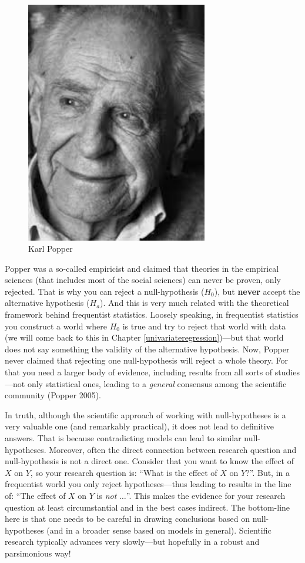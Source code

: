 \documentclass[
]{book}
\begin{document}
\begin{figure}

{\centering \includegraphics[width=300px]{./figures/popper} 

}

\caption{Karl Popper}\label{fig:popper}
\end{figure}

Popper was a so-called empiricist and claimed that theories in the empirical sciences (that includes most of the social sciences) can never be proven, only rejected. That is why you can reject a null-hypothesis (\(H_0\)), but \textbf{never} accept the alternative hypothesis (\(H_a\)). And this is very much related with the theoretical framework behind frequentist statistics. Loosely speaking, in frequentist statistics you construct a world where \(H_0\) is true and try to reject that world with data (we will come back to this in Chapter \ref{univariateregression})---but that world does not say something the validity of the alternative hypothesis. Now, Popper never claimed that rejecting one null-hypothesis will reject a whole theory. For that you need a larger body of evidence, including results from all sorts of studies---not only statistical ones, leading to a \emph{general} consensus among the scientific community (Popper 2005).

In truth, although the scientific approach of working with null-hypotheses is a very valuable one (and remarkably practical), it does not lead to definitive answers. That is because contradicting models can lead to similar null-hypotheses. Moreover, often the direct connection between research question and null-hypothesis is not a direct one. Consider that you want to know the effect of \(X\) on \(Y\), so your research question is: ``What is the effect of \(X\) on \(Y\)?''. But, in a frequentist world you only reject hypotheses---thus leading to results in the line of: ``The effect of \(X\) on \(Y\) is \emph{not} \(\ldots\)''. This makes the evidence for your research question at least circumstantial and in the best cases indirect. The bottom-line here is that one needs to be careful in drawing conclusions based on null-hypotheses (and in a broader sense based on models in general). Scientific research typically advances very slowly---but hopefully in a robust and parsimonious way!
\end{document}
